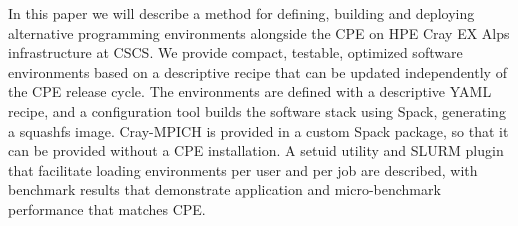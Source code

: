 In this paper we will describe a method for defining, building and deploying alternative programming environments alongside the CPE on HPE Cray EX Alps infrastructure at CSCS.
We provide compact, testable, optimized software environments based on a descriptive recipe that can be updated independently of the CPE release cycle.
The environments are defined with a descriptive YAML recipe, and a configuration tool builds the software stack using Spack, generating a squashfs image.
Cray-MPICH is provided in a custom Spack package, so that it can be provided without a CPE installation.
A setuid utility and SLURM plugin that facilitate loading environments per user and per job are described, with benchmark results that demonstrate application and micro-benchmark performance that matches CPE.

